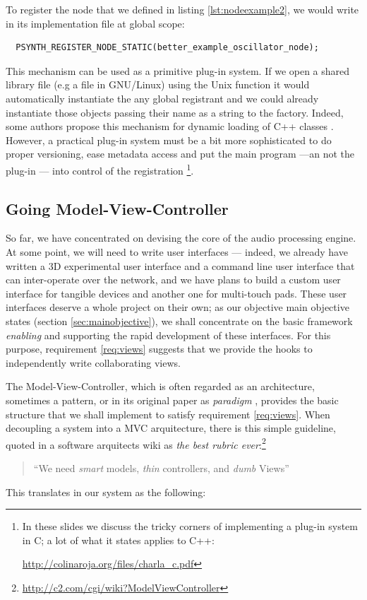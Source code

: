To register the node that we defined in listing
\ref{lst:nodeexample2}, we would write in its 
implementation file at global scope:
\begin{lstlisting}
  PSYNTH_REGISTER_NODE_STATIC(better_example_oscillator_node);
\end{lstlisting}

This mechanism can be used as a primitive plug-in system. If we open a
shared library file (e.g a  file in GNU/Linux) using the
Unix  function it would automatically instantiate the
any global registrant and we could already instantiate those objects
passing their name as a string to the factory. Indeed, some authors
propose this mechanism for dynamic loading of C++ classes
\cite{norton00dynamic, beveridge98self}. However, a practical plug-in
system must be a bit more sophisticated to do proper versioning, ease
metadata access and put the main program ---an not the plug-in ---
into control of the registration \footnote{In these slides we discuss
  the tricky corners of implementing a plug-in system in C; a lot of
  what it states applies to C++:

\url{http://colinaroja.org/files/charla_c.pdf}}.

\subsection{Going Model-View-Controller}
\label{sec:graphmvc}

So far, we have concentrated on devising the core of the audio
processing engine. At some point, we will need to write user
interfaces --- indeed, we already have written a 3D experimental user
interface and a command line user interface that can inter-operate
over the network, and we have plans to build a custom user interface
for tangible devices and another one for multi-touch pads. These user
interfaces deserve a whole project on their own; as our objective main
objective states (section \ref{sec:mainobjective}), we shall
concentrate on the basic framework \emph{enabling} and supporting the
rapid development of these interfaces. For this purpose, requirement
\ref{req:views} suggests that we provide the hooks to independently
write collaborating views.

The Model-View-Controller, which is often regarded as an architecture,
sometimes a pattern, or in its original paper as \emph{paradigm}
\cite{krasner88mvc}, provides the basic structure that we shall
implement to satisfy requirement \ref{req:views}. When decoupling a
system into a MVC arquitecture, there is this simple guideline, quoted
in a software arquitects wiki as \emph{the best rubric
  ever}:\footnote{\url{http://c2.com/cgi/wiki?ModelViewController}}
\begin{quote}
  ``We need \emph{smart} models, \emph{thin} controllers, and
  \emph{dumb} Views''
\end{quote}
This translates in our system as the following:

